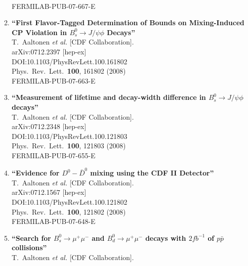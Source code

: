 \documentclass{article}
\begin{document}
\begin{enumerate}
  \\{}FERMILAB-PUB-07-667-E
\item%
{\bf ``First Flavor-Tagged Determination of Bounds on Mixing-Induced CP Violation in $B^0_{s} \to J/\psi \phi$ Decays''}
  \\{}T.~Aaltonen {\it et al.} [CDF Collaboration].
  \\{}arXiv:0712.2397 [hep-ex]
  \\{}DOI:10.1103/PhysRevLett.100.161802
  \\{}Phys.\ Rev.\ Lett.\  {\bf 100}, 161802 (2008)
  \\{}FERMILAB-PUB-07-663-E
\item%
{\bf ``Measurement of lifetime and decay-width difference in $B^0_{s} \to J/\psi \phi$ decays''}
  \\{}T.~Aaltonen {\it et al.} [CDF Collaboration].
  \\{}arXiv:0712.2348 [hep-ex]
  \\{}DOI:10.1103/PhysRevLett.100.121803
  \\{}Phys.\ Rev.\ Lett.\  {\bf 100}, 121803 (2008)
  \\{}FERMILAB-PUB-07-655-E
\item%
{\bf ``Evidence for $D^0 - \bar{D}^0$ mixing using the CDF II Detector''}
  \\{}T.~Aaltonen {\it et al.} [CDF Collaboration].
  \\{}arXiv:0712.1567 [hep-ex]
  \\{}DOI:10.1103/PhysRevLett.100.121802
  \\{}Phys.\ Rev.\ Lett.\  {\bf 100}, 121802 (2008)
  \\{}FERMILAB-PUB-07-648-E
\item%
{\bf ``Search for $B^0_{s} \to \mu^{+} \mu^{-}$ and $B^0_{d} \to \mu^{+} \mu^{-}$ decays with $2fb^{-1}$ of $p \bar{p}$ collisions''}
  \\{}T.~Aaltonen {\it et al.} [CDF Collaboration].

\end{enumerate}
\end{document}

